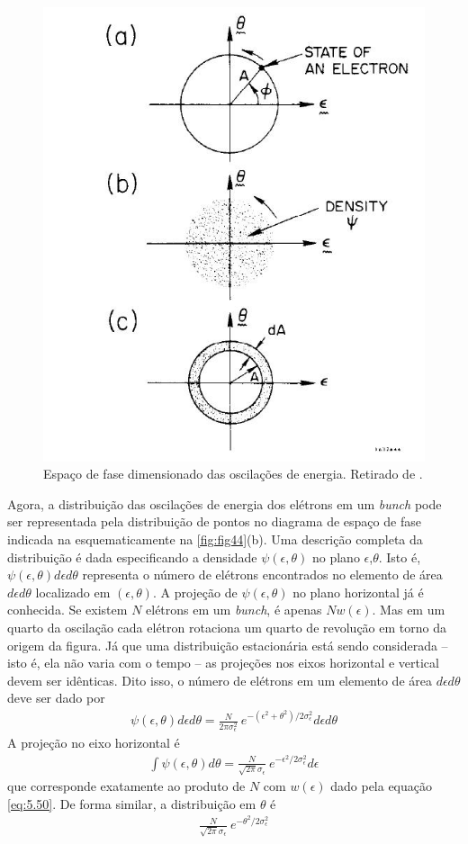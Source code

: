 \begin{figure}[!htb]
	\centering
	\includegraphics[width=0.6\linewidth]{./Figuras/fig44.jpeg}
	\caption{Espaço de fase dimensionado das oscilações de energia. Retirado de \cite{sands1970physics}.}
	\label{fig:fig44}
\end{figure}

Agora, a distribuição das oscilações de energia dos elétrons em um \textit{bunch} pode ser representada pela distribuição de pontos no diagrama de espaço de fase indicada na esquematicamente na \autoref{fig:fig44}(b). Uma descrição completa da distribuição é dada especificando a densidade $\psi(\epsilon,\theta)$ no plano $\epsilon$,$\theta$. Isto é, $\psi(\epsilon,\theta)d\epsilon d\theta$ representa o número de elétrons encontrados no elemento de área $d\epsilon d\theta$ localizado em $(\epsilon,\theta)$. A projeção de $\psi(\epsilon,\theta)$ no plano horizontal já é conhecida. Se existem $N$ elétrons em um \textit{bunch}, é apenas $Nw(\epsilon)$. Mas em um quarto da oscilação cada elétron rotaciona um quarto de revolução em torno da origem da figura. Já que uma distribuição estacionária está sendo considerada -- isto é, ela não varia com o tempo -- as projeções nos eixos horizontal e vertical devem ser idênticas. Dito isso, o número de elétrons em um elemento de área $d\epsilon d\theta$ deve ser dado por
\begin{align}
	\psi(\epsilon,\theta)d\epsilon d\theta = \frac{N}{2\pi \sigma_\epsilon^2}\ e^{-(\epsilon^2+\theta^2)/2\sigma_\epsilon^2}d\epsilon d\theta
\end{align}
A projeção no eixo horizontal é
\begin{align}
	\int \psi(\epsilon,\theta)d\theta = \frac{N}{\sqrt{2\pi}\sigma_\epsilon}\ e^{-\epsilon^2/2\sigma_\epsilon^2}d\epsilon
\end{align}
que corresponde exatamente ao produto de $N$ com $w(\epsilon)$ dado pela equação \eqref{eq:5.50}. De forma similar, a distribuição em $\theta$ é
\begin{align}
	\frac{N}{\sqrt{2\pi}\sigma_\epsilon}\ e^{-\theta^2/2\sigma_\epsilon^2}
\end{align}

